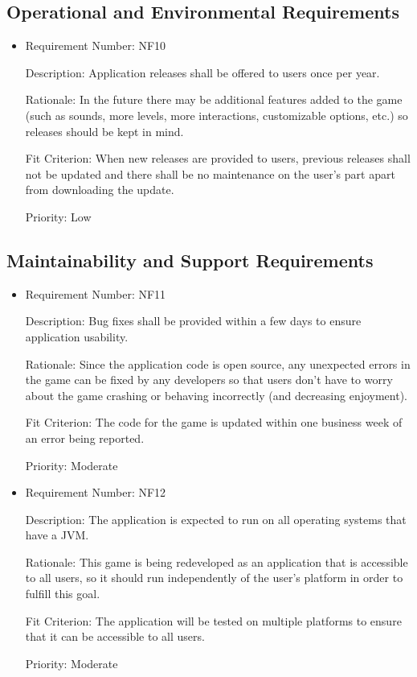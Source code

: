 \documentclass[12pt, titlepage]{article}
\begin{document}
\subsection{Operational and Environmental Requirements}
\begin{itemize}
	\item
	Requirement Number: \hypertarget{nf10}{NF10}

	Description: Application releases shall be offered to users once per year.

	Rationale: In the future there may be additional features added to the game (such as sounds, more levels, more interactions, customizable options, etc.) so releases should be kept in mind.

	Fit Criterion: When new releases are provided to users, previous releases shall not be updated and there shall be no maintenance on the user's part apart from downloading the update.

	Priority: Low

\end{itemize}

\subsection{Maintainability and Support Requirements}
\begin{itemize}
	\item
	Requirement Number: \hypertarget{nf11}{NF11}

	Description: Bug fixes shall be provided within a few days to ensure application usability.

	Rationale: Since the application code is open source, any unexpected errors in the game can be fixed by any developers so that users don't have to worry about the game crashing or behaving incorrectly (and decreasing enjoyment).

	Fit Criterion: The code for the game is updated within one business week of an error being reported.

	Priority: Moderate

	\item
	Requirement Number: \hypertarget{nf12}{NF12}

	Description: The application is expected to run on all operating systems that have a JVM.

	Rationale: This game is being redeveloped as an application that is accessible to all users, so it should run independently of the user's platform in order to fulfill this goal.

	Fit Criterion: The application will be tested on multiple platforms to ensure that it can be accessible to all users.

	Priority: Moderate
\end{itemize}
\end{document}

